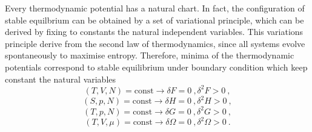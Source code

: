     Every thermodynamic potential has a natural chart. In fact, the configuration of stable equilbrium can be obtained by a set of variational principle, which can be derived by fixing to constants the natural independent variables. This variations principle derive from the second law of thermodynamics, since all systems evolve spontaneously to maximise entropy. Therefore, minima of the thermodynamic potentials correspond to stable equilibrium under boundary condition which keep constant the natural variables
    \begin{equation*}
        (T, V, N) = \text{const} \rightarrow \delta F = 0 ~, \delta^2 F > 0 ~, 
    \end{equation*}
    \begin{equation*}
        (S, p, N) = \text{const} \rightarrow \delta H = 0 ~, \delta^2 H > 0 ~, 
    \end{equation*}
    \begin{equation*}
        (T, p, N) = \text{const} \rightarrow \delta G = 0 ~, \delta^2 G > 0 ~, 
    \end{equation*}
    \begin{equation*}
        (T, V, \mu) = \text{const} \rightarrow \delta \Omega = 0 ~, \delta^2 \Omega > 0 ~.
    \end{equation*}

